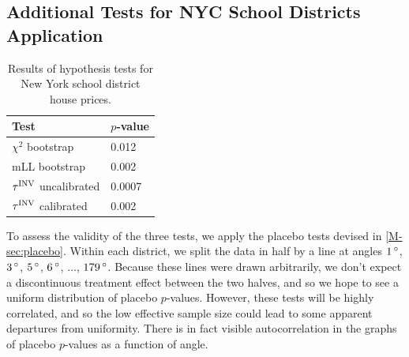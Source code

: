 \documentclass[letter,12pt]{article}
\begin{document}
\subsection{Additional Tests for NYC School Districts Application}
\label{sec:nyc_hypothesis_tests}

\begin{table}[tbp]
    \centering
    \bgroup
    \def\arraystretch{1.1}%
    \label{table:NYC_tests}
    \begin{tabular}{ll}
        \hline
        Test                   & $p$-value \\
        \hline
        $\chi^2$ bootstrap     & 0.012     \\
        mLL bootstrap          & 0.002     \\
        $\tau^{\mathrm{INV}}$ uncalibrated & 0.0007    \\
        $\tau^{\mathrm{INV}}$ calibrated   & 0.002 \\
        \hline
    \end{tabular}
    \egroup
    \caption{Results of hypothesis tests for New York school district house prices.}
\end{table}

To assess the validity of the three tests, we apply the placebo tests devised in \autoref*{M-sec:placebo}.
Within each district, we split the data in half by a line at angles \(1{\,^\circ}\), \(3{\,^\circ}\), \(5{\,^\circ}\), \(6{\,^\circ}\), \(\dotsc\), \(179{\,^\circ}\).
Because these lines were drawn arbitrarily, we don't expect a discontinuous treatment effect between the two halves, and so we hope to see a uniform distribution of placebo \(p\)-values.
However, these tests will be highly correlated,
and so the low effective sample size could lead to some apparent departures from uniformity.
There is in fact visible autocorrelation in the graphs of placebo \(p\)-values as a function of angle.
\end{document}
